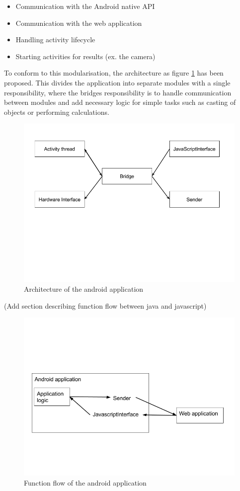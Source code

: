 \documentclass{./tex/cslthse-msc}
\begin{document}
\begin{itemize}
\item Communication with the Android native API
\item Communication with the web application
\item Handling activity lifecycle
\item Starting activities for results (ex. the camera)
\end{itemize}


To conform to this modularisation, the architecture as figure \ref{caption-android-architecture} has been proposed. This divides the application into separate modules with a single responsibility, where the bridges responsibility is to handle communication between modules and add necessary logic for simple tasks such as casting of objects or performing calculations. 


\begin{figure}[ht!]
    \centering
    \includegraphics[width=120mm,natwidth=800,natheight=600]{./img/androidStructure.png}
    \caption{Architecture of the android application\label{caption-android-architecture}}
\end{figure}


(Add section describing function flow between java and javascript)

\begin{figure}[ht!]
    \centering
    \includegraphics[width=120mm,natwidth=720,natheight=540]{./img/androidFlow.png}
    \caption{Function flow of the android application\label{caption-android-flow}}
\end{figure}
\end{document}

